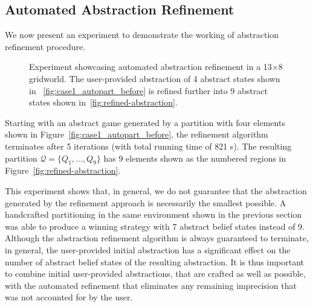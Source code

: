 





\subsection{Automated Abstraction Refinement}
We now present an experiment to demonstrate the working of abstraction refinement procedure. 


\begin{figure}
{}
\caption{Experiment showcasing automated abstraction refinement in a 13$\times$8 gridworld. The user-provided abstraction of 4 abstract states shown in ~\ref{fig:case1_autopart_before} is refined further into 9 abstract states shown in~\ref{fig:refined-abstraction}.}
\label{fig:case1_autopart}
\end{figure}



Starting with an abstract game generated by a partition with four elements shown in Figure~\ref{fig:case1_autopart_before}, the refinement algorithm terminates after 5 iterations (with total running time of 821 s). The resulting partition $\mathcal{Q} = \{Q_1,...,Q_9 \}$ has $9$ elements shown as the numbered regions in Figure~\ref{fig:refined-abstraction}.

This experiment shows that, in general, we do not guarantee that the abstraction generated by the refinement approach is necessarily the smallest possible. A handcrafted partitioning in the same environment shown in the previous section was able to produce a winning strategy with 7 abstract belief states instead of 9. Although the abstraction refinement algorithm is always guaranteed to terminate, in general, the user-provided initial abstraction has a significant effect on the number of abstract belief states of the resulting abstraction. It is thus important to combine initial user-provided abstractions, that are crafted as well as possible, with the automated refinement that eliminates any remaining imprecision that was not accounted for by the user.

